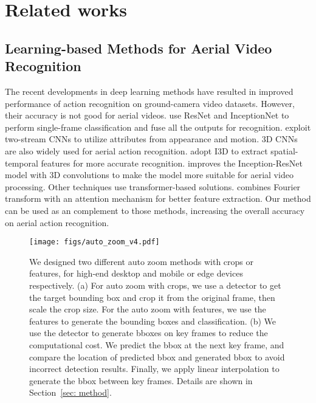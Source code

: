\documentclass[letterpaper, 10 pt, conference]{ieeeconf}
\begin{document}
 \section{Related works}
\label{sec: related_work}

\subsection{Learning-based Methods for Aerial Video Recognition}
The recent developments in deep learning methods have resulted in improved performance of action recognition on ground-camera video datasets\cite{rezazadegan2017action, soans2020sa, van2020multi, massardi2020parc, yao2022pa,shao2018hierarchical,lea2016learning}. However, their accuracy is not good for aerial videos\cite{nguyen2022state}. \cite{geraldes2019uav,mliki2020human,mishra2020drone,mou2020event} use ResNet and InceptionNet to perform single-frame classification and fuse all the outputs for recognition. 
\cite{barekatain2017okutama,perera2019drone,perera2020multiviewpoint} exploit two-stream CNNs to utilize attributes from appearance and motion. 3D CNNs are also widely used for aerial action recognition. \cite{choi2020unsupervised,demir2021tinyvirat,li2021uav,mou2020event,sultani2021human} adopt I3D\cite{carreira2017quo} to extract spatial-temporal features for more accurate recognition. \cite{peng2020fully} improves the Inception-ResNet model with 3D convolutions to make the model more suitable for aerial video processing. Other techniques use transformer-based solutions. \cite{kothandaraman2022fourier} combines Fourier transform with an attention mechanism for better feature extraction. Our method can be used as an complement to those methods, increasing the overall accuracy on aerial action recognition.


\begin{figure*}[t]
    \centering
        \texttt{[image: figs/auto\_zoom\_v4.pdf]}
        \caption{We designed two different auto zoom methods with crops or features, for high-end desktop and mobile or edge devices respectively. (a) For auto zoom with crops, we use a detector to get the target bounding box and crop it from the original frame, then scale the crop size. For the auto zoom with features, we use the features to generate the bounding boxes and classification. (b) We use the detector to generate bboxes on key frames to reduce the computational cost. We predict the bbox at the next key frame, and compare the location of predicted bbox and generated bbox to avoid incorrect detection results. Finally, we apply linear interpolation to generate the bbox between key frames. Details are shown in Section~\ref{sec: method}.}
    \label{fig: auto_zoom}
    \vspace{-10pt}
\end{figure*}
\end{document}
